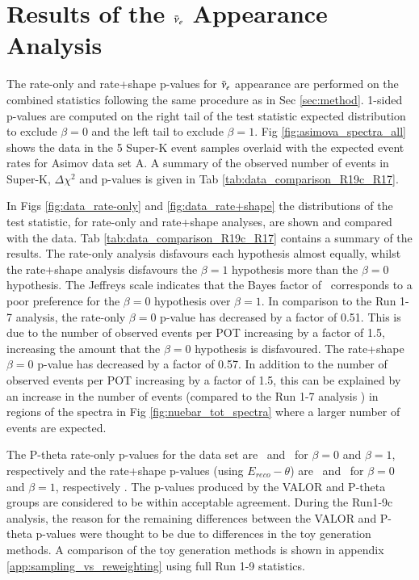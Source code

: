 \section {Results of the $\bar{\nu}_{e}$ Appearance Analysis}
\label{sec:results}
The rate-only and rate+shape p-values for $\bar{\nu}_{e}$ appearance are performed on the combined \RunPeriod statistics following the same procedure as in Sec \ref{sec:method}. 1-sided p-values are computed on the right tail of the test statistic expected distribution to exclude $\beta = 0$ and the left tail to exclude $\beta = 1$. Fig \ref{fig:asimova_spectra_all} shows the data in the 5 Super-K event samples overlaid with the expected event rates for Asimov data set A. A summary of the observed number of events in Super-K, $\Delta \chi^2$ and p-values is given in Tab \ref{tab:data_comparison_R19c_R17}.



In Figs \ref{fig:data_rate-only} and \ref{fig:data_rate+shape} the distributions of the test statistic, for rate-only and rate+shape analyses, are shown and compared with the data. Tab \ref{tab:data_comparison_R19c_R17} contains a summary of the results. The rate-only analysis disfavours each hypothesis almost equally, whilst the rate+shape analysis disfavours the $\beta = 1$ hypothesis more than the $\beta = 0$ hypothesis. The Jeffreys scale indicates that the Bayes factor of \BayesFactorData\ corresponds to a poor preference for the $\beta = 0$ hypothesis over $\beta = 1$. %
In comparison to the Run 1-7 analysis, the rate-only $\beta = 0$ p-value has decreased by a factor of 0.51. This is due to the number of observed events per POT increasing by a factor of 1.5, increasing the amount that the $\beta = 0$ hypothesis is disfavoured. The rate+shape $\beta = 0$ p-value has decreased by a factor of 0.57. In addition to the number of observed events per POT increasing by a factor of 1.5, this can be explained by an increase in the number of events (compared to the Run 1-7 analysis \cite{OurRun16AntiNueBarAppearanceAnalysis3Flavour}) in regions of the spectra in Fig \ref{fig:nuebar_tot_spectra} where a larger number of events are expected.

The P-theta rate-only p-values for the \RunPeriod data set are \PthetaPvalDataRateOnlyBetaZero\ and \PthetaPvalDataRateOnlyBetaOne\ for $\beta = 0$ and $\beta = 1$, respectively and the rate+shape p-values (using $E_{reco}-\theta$) are \PthetaPvalDataRateShapeErecThetaBetaZero\ and \PthetaPvalDataRateShapeErecThetaBetaOne\ for $\beta = 0$ and $\beta = 1$, respectively \cite{PthetaR19cNuebarAppearance}. The p-values produced by the VALOR and P-theta groups are considered to be within acceptable agreement. {\color{red} During the Run1-9c analysis,} the reason for the remaining differences between the VALOR and P-theta p-values {\color{red}were} thought to be due to differences in the toy generation methods. {\color{red} A comparison of the toy generation methods is shown in appendix \ref{app:sampling_vs_reweighting} using full Run 1-9 statistics.}

